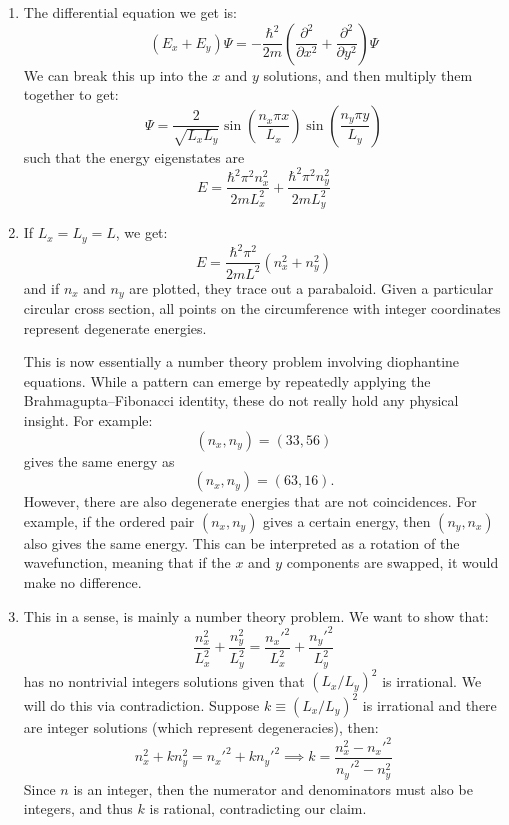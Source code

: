 \begin{sol}
\begin{enumerate}[label=\textbf{(\alph*)}]
\item The differential equation we get is:
$$(E_x+E_y)\Psi=-\frac{\hbar^2}{2m}\left(\frac{\partial^2}{\partial x^2}+\frac{\partial^2}{\partial y^2}\right)\Psi$$
We can break this up into the $x$ and $y$ solutions, and then multiply them together to get:
$$\Psi = \frac{2}{\sqrt{L_xL_y}}\sin\left(\frac{n_x \pi x}{L_x}\right)\sin\left(\frac{n_y \pi y}{L_y}\right)$$
such that the energy eigenstates are
$$E=\frac{\hbar^2\pi^2n_x^2}{2mL_x^2}+\frac{\hbar^2\pi^2n_y^2}{2mL_y^2}$$
\item If $L_x=L_y=L$, we get:
$$E=\frac{\hbar^2\pi^2}{2mL^2}(n_x^2+n_y^2)$$
and if $n_x$ and $n_y$ are plotted, they trace out a parabaloid. Given a particular circular cross section, all points on the circumference with integer coordinates represent degenerate energies. 
\begin{center}
\end{center}
This is now essentially a number theory problem involving diophantine equations. While a pattern can emerge by repeatedly applying the Brahmagupta–Fibonacci identity, these do not really hold any physical insight. For example:
$$(n_x,n_y)=(33,56)$$
gives the same energy as
$$(n_x,n_y)=(63,16).$$
However, there are also degenerate energies that are not coincidences. For example, if the ordered pair $(n_x,n_y)$ gives a certain energy, then $(n_y,n_x)$ also gives the same energy. This can be interpreted as a rotation of the wavefunction, meaning that if the $x$ and $y$ components are swapped, it would make no difference.
\item This in a sense, is mainly a number theory problem. We want to show that:
$$\frac{n_x^2}{L_x^2}+\frac{n_y^2}{L_y^2}=\frac{n_x'^2}{L_x^2}+\frac{n_y'^2}{L_y^2}$$
has no nontrivial integers solutions given that $(L_x/L_y)^2$ is irrational. We will do this via contradiction. Suppose $k\equiv (L_x/L_y)^2$ is irrational and there are integer solutions (which represent degeneracies), then:
$$n_x^2+kn_y^2=n_x'^2+kn_y'^2 \implies k=\frac{n_x^2-n_x'^2}{n_y'^2-n_y^2}$$
Since $n$ is an integer, then the numerator and denominators must also be integers, and thus $k$ is rational, contradicting our claim.
\end{enumerate}
\end{sol}